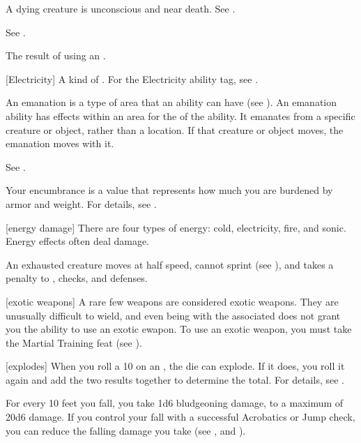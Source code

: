  A dying creature is unconscious and near death. See .

 See .

 The result of using an .

[Electricity] A kind of . For the Electricity ability tag, see .

 An emanation is a type of area that an ability can have (see ).
An emanation ability has effects within an area for the  of the ability.
It emanates from a specific creature or object, rather than a location.
If that creature or object moves, the emanation moves with it.

 See .

 Your encumbrance is a value that represents how much you are burdened by armor and weight.
For details, see .

[energy damage] There are four types of energy: cold, electricity, fire, and sonic. Energy effects often deal damage.


 An exhausted creature moves at half speed, cannot sprint (see ), and takes a  penalty to , checks, and defenses.

[exotic weapons] A rare few weapons are considered exotic weapons.
They are unusually difficult to wield, and even being  with the associated  does not grant you the ability to use an exotic ewapon.
To use an exotic weapon, you must take the Martial Training feat (see ).

[explodes] When you roll a 10 on an , the die can explode.
If it does, you roll it again and add the two results together to determine the total.
For details, see .

 For every 10 feet you fall, you take 1d6 bludgeoning damage, to a maximum of 20d6 damage.
If you control your fall with a successful Acrobatics or Jump check, you can reduce the falling damage you take (see , and ).


